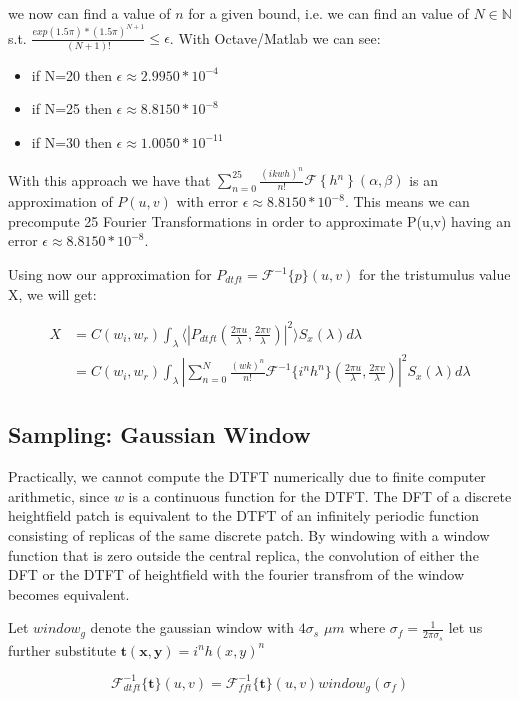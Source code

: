 we now can find a value of $n$ for a given bound, i.e. we can find an value of $N\mathbb{\in N}$ s.t. $\frac{exp(1.5\pi)*(1.5\pi)^{N+1}}{(N+1)!}\leq\epsilon$.
With Octave/Matlab we can see: 
\begin{itemize}
\item if N=20 then $\epsilon\approx2.9950*10^{-4}$
\item if N=25 then $\epsilon\approx8.8150*10^{-8}$
\item if N=30 then $\epsilon\approx1.0050*10^{-11}$
\end{itemize}

With this approach we have that $\sum_{n=0}^{25}\frac{(ikwh)^{n}}{n!}\mathcal{F}\left\{ h{}^{n}\right\} (\alpha,\beta)$ is
an approximation of $P(u,v)$ with error $\epsilon\approx8.8150*10^{-8}$. This means we can precompute 25 Fourier Transformations in order to approximate P(u,v) having an error $\epsilon\approx8.8150*10^{-8}$. 

Using now our approximation for $P_{dtft} = \mathcal{F}^{-1}\{p\}(u,v)$ for the tristumulus value X, we will get:

\begin{align*}
X 
& = C(w_i,w_r) \int_{\lambda} \langle \left|P_{dtft}(\frac{2\pi u}{\lambda}, \frac{2\pi v}{\lambda})\right|^2\rangle S_x(\lambda)d\lambda \\
& = C(w_i,w_r) \int_{\lambda} \left| \sum_{n=0}^N \frac{(wk)^n}{n!} \mathcal{F}^{-1}\{i^n h^n\}(\frac{2\pi u}{\lambda}, \frac{2\pi v}{\lambda})\right|^2 S_x(\lambda)d\lambda
\end{align*}

\subsection{Sampling: Gaussian Window}
Practically, we cannot compute the DTFT numerically due to finite computer arithmetic, since $w$ is a continuous function for the DTFT. 
The DFT of a discrete heightfield patch is equivalent to the DTFT of an infinitely periodic function consisting of replicas of the same discrete patch. By windowing with a window function that is zero outside the central replica, the convolution of either the DFT or the DTFT of heightfield with the fourier transfrom of the window becomes equivalent.

Let $window_g$ denote the gaussian window with $4\sigma_s$ $\mu m$ where $\sigma_f = \frac{1}{2\pi\sigma_s}$
let us further substitute $\mathbf{t(x,y)}=i^n h(x,y)^n$

\begin{equation}
\mathcal{F}_{dtft}^{-1}\{\mathbf{t}\}(u,v) = \mathcal{F}_{fft}^{-1}\{\mathbf{t}\}(u,v)window_g(\sigma_f)
\end{equation} 

